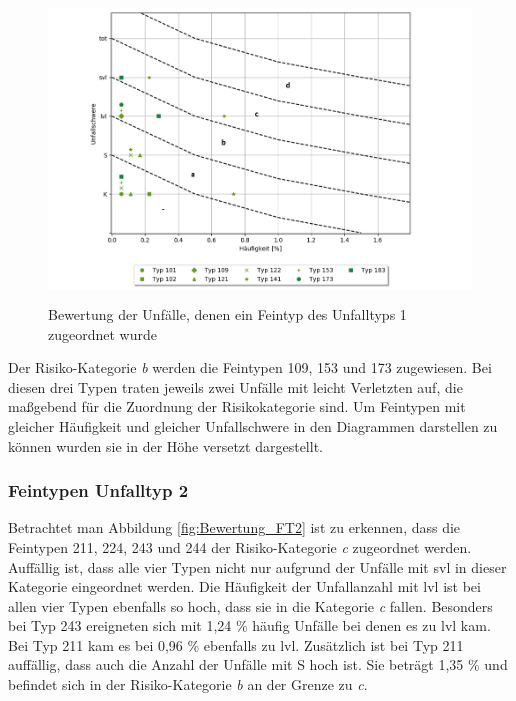 \begin{savenotes}
	\begin{figure}[H]
		\centering
		\includegraphics[width=12cm,height=8cm]{figures/Bewertung_FT1}
		\caption[Bewertung der Unfälle, denen ein Feintyp des Unfalltyps 1 zugeordnet wurde]{Bewertung der Unfälle, denen ein Feintyp des Unfalltyps 1 zugeordnet wurde}\label{fig:Bewertung_FT1}
	\end{figure}
\end{savenotes}

Der Risiko-Kategorie \textit{b} werden die Feintypen 109, 153 und 173 zugewiesen. Bei diesen drei Typen traten jeweils zwei Unfälle mit leicht Verletzten auf, die maßgebend für die Zuordnung der Risikokategorie sind. Um Feintypen mit gleicher Häufigkeit und gleicher Unfallschwere in den Diagrammen darstellen zu können wurden sie in der Höhe versetzt dargestellt.

\subsubsection{Feintypen Unfalltyp 2}
Betrachtet man Abbildung \ref{fig:Bewertung_FT2} ist zu erkennen, dass die Feintypen 211, 224, 243 und 244 der Risiko-Kategorie \textit{c} zugeordnet werden. Auffällig ist, dass alle vier Typen nicht nur aufgrund der Unfälle mit \ac{svl} in dieser Kategorie eingeordnet werden. Die Häufigkeit der Unfallanzahl mit \ac{lvl} ist bei allen vier Typen ebenfalls so hoch, dass sie in die Kategorie \textit{c} fallen. Besonders bei Typ 243 ereigneten sich mit 1,24 \% häufig Unfälle bei denen es zu \ac{lvl} kam. Bei Typ 211 kam es bei 0,96 \% ebenfalls zu \ac{lvl}. Zusätzlich ist bei Typ 211 auffällig, dass auch die Anzahl der Unfälle mit \ac{S} hoch ist. Sie beträgt 1,35 \% und befindet sich in der Risiko-Kategorie \textit{b} an der Grenze zu \textit{c}.

